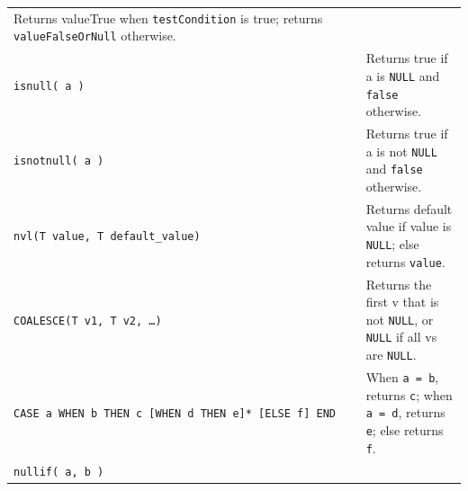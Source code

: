 \documentclass[
]{article}
\begin{document}
\begin{longtable}[]{@{}ll@{}}
\begin{minipage}[t]{0.55\columnwidth}
Returns valueTrue when \texttt{testCondition} is true; returns
\texttt{valueFalseOrNull} otherwise.\strut
\end{minipage}\tabularnewline
\begin{minipage}[t]{0.39\columnwidth}\raggedright
\texttt{isnull(\ a\ )}\strut
\end{minipage} & \begin{minipage}[t]{0.55\columnwidth}\raggedright
Returns true if a is \texttt{NULL} and \texttt{false} otherwise.\strut
\end{minipage}\tabularnewline
\begin{minipage}[t]{0.39\columnwidth}\raggedright
\texttt{isnotnull(\ a\ )}\strut
\end{minipage} & \begin{minipage}[t]{0.55\columnwidth}\raggedright
Returns true if a is not \texttt{NULL} and \texttt{false}
otherwise.\strut
\end{minipage}\tabularnewline
\begin{minipage}[t]{0.39\columnwidth}\raggedright
\texttt{nvl(T\ value,\ T\ default\_value)}\strut
\end{minipage} & \begin{minipage}[t]{0.55\columnwidth}\raggedright
Returns default value if value is \texttt{NULL}; else returns
\texttt{value}.\strut
\end{minipage}\tabularnewline
\begin{minipage}[t]{0.39\columnwidth}\raggedright
\texttt{COALESCE(T\ v1,\ T\ v2,\ \ldots{})}\strut
\end{minipage} & \begin{minipage}[t]{0.55\columnwidth}\raggedright
Returns the first v that is not \texttt{NULL}, or \texttt{NULL} if all
vs are \texttt{NULL}.\strut
\end{minipage}\tabularnewline
\begin{minipage}[t]{0.39\columnwidth}\raggedright
\texttt{CASE\ a\ WHEN\ b\ THEN\ c\ {[}WHEN\ d\ THEN\ e{]}*\ {[}ELSE\ f{]}\ END}\strut
\end{minipage} & \begin{minipage}[t]{0.55\columnwidth}\raggedright
When \texttt{a\ =\ b}, returns \texttt{c}; when \texttt{a\ =\ d},
returns \texttt{e}; else returns \texttt{f}.\strut
\end{minipage}\tabularnewline
\begin{minipage}[t]{0.39\columnwidth}\raggedright
\texttt{nullif(\ a,\ b\ )}\strut
\end{minipage} & \begin{minipage}[t]{0.55\columnwidth}\raggedright

\end{minipage}
\end{longtable}
\end{document}
